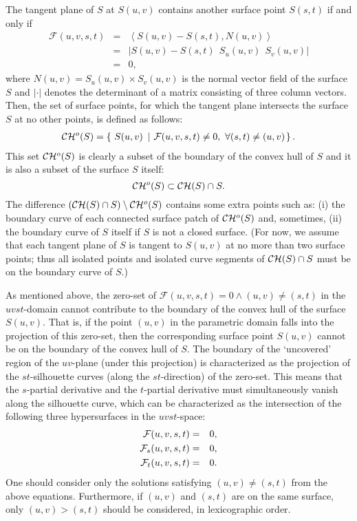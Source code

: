 \documentclass[11pt]{article}          %
\newcommand{\CH}{{\cal C}{\cal H}}
\newcommand{\inner}[2]{\left<{#1}, {#2} \right>}
\begin{document}
The tangent plane of $S$ at $S(u,v)$ contains
another surface point $S(s,t)$ if and only if 
\begin{eqnarray*}
   {\mathcal F}(u,v,s,t) &=& \inner{S(u,v)-S(s,t)}{N(u,v)}\\
   &=& |S(u,v)-S(s,t)\ \ S_u(u,v)\ \ S_v(u,v)|\\
   &=& 0,
\end{eqnarray*}
where $N(u,v) = S_u(u,v) \times S_v(u,v)$ is the normal vector field 
of the surface $S$ and $| \cdot |$ denotes the determinant of
a matrix consisting of three column vectors.
Then, the set of surface points, for which 
the tangent plane intersects the surface $S$ at no other points, 
is defined as follows:
\begin{eqnarray*}
\CH{}^o(S) = \left\{~S(u,v)~\left|~ 
{\cal F}(u,v,s,t) \neq 0,~\forall (s,t) \neq (u,v) \right. \right\}.
\end{eqnarray*}
This set $\CH{}^o(S)$ is clearly a subset of the boundary of the convex hull
of $S$ and it is also a subset of the surface $S$ itself:
\begin{equation}
    \CH{}^o(S) \subset \CH{}(S) \cap S.
\label{eqn-cho-ch}
\end{equation}
The difference $(\CH{}(S) \cap S) \setminus \CH{}^o(S)$ contains some extra
points such as: (i) the boundary curve of each connected surface patch of
$\CH{}^o(S)$ and, sometimes, (ii) the boundary curve of $S$ itself if $S$ is 
not a closed surface.  (For now, we assume that each tangent plane of $S$ is
tangent to $S(u,v)$ at no more than two surface points;
thus all isolated points and isolated curve segments of
$\CH{}(S) \cap S$ must be on the boundary curve of $S$.)

As mentioned above, the zero-set of 
${\mathcal F}(u,v,s,t) = 0 \wedge (u,v) \neq (s,t)$ in
the $uvst$-domain cannot contribute to the boundary of the convex hull
of the surface $S(u,v)$. That is, if the point $(u,v)$ in the parametric
domain falls into the projection of this zero-set, then the corresponding
surface point $S(u,v)$ cannot be on the boundary of the convex hull 
of $S$. The boundary of the `uncovered' region of the $uv$-plane
(under this projection) is characterized as the projection of the 
$st$-silhouette curves (along the $st$-direction) of the zero-set. This means
that the $s$-partial derivative and the $t$-partial derivative must 
simultaneously vanish along the silhouette curve, which can be 
characterized as the
intersection of the following three hypersurfaces in the $uvst$-space:
\begin{eqnarray}
   {\cal F}(u,v,s,t) &=& 0, \label{eqn-f-uvst} \\
   {\cal F}_s(u,v,s,t) &=& 0, \label{eqn-s-partial}\\
   {\cal F}_t(u,v,s,t) &=& 0. \label{eqn-t-partial}
\end{eqnarray}
One should consider only the solutions satisfying $(u,v) \neq (s,t)$
from the above equations. Furthermore, if $(u,v)$ and $(s,t)$ are
on the same surface, only $(u,v) > (s,t)$ should be considered, in
lexicographic order.
\end{document}
